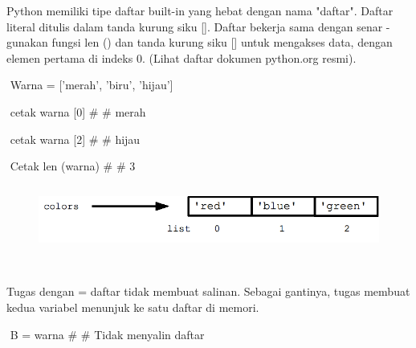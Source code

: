 \documentclass[a4paper,12pt]{report}
\begin{document}
\vspace{14pt}
\noindent 
Python memiliki tipe daftar built-in yang hebat dengan nama "daftar". Daftar literal ditulis dalam tanda kurung siku []. Daftar bekerja sama dengan senar - gunakan fungsi len () dan tanda kurung siku [] untuk mengakses data, dengan elemen pertama di indeks 0. (Lihat daftar dokumen python.org resmi). \par
\noindent 
\vspace{10pt}
\noindent 
{\fontsize{10pt}{10pt}\selectfont  $  $ $  $Warna = ['merah', 'biru', 'hijau']} \par
\noindent 
 $  $ $  $cetak warna [0]  $  \#  $ $  \#  $ merah \par
\noindent 
 $  $ $  $cetak warna [2]  $  \#  $ $  \#  $ hijau \par
\noindent 
 $  $ $  $Cetak len (warna)  $  \#  $ $  \#  $ 3 \par
\noindent 
\vspace{12pt}
\noindent 
\vspace{12pt}
\noindent 




\begin{figure}[H]
\begin{center}
\includegraphics[width=6.26in,height=0.88in]{./uploads_new/LISTS.docx_DIR/media/image1.png}
\end{center}
\end{figure}




{\fontsize{14pt}{14pt}\selectfont  \\}\vspace{14pt}
\noindent 
Tugas dengan = daftar tidak membuat salinan. Sebagai gantinya, tugas membuat kedua variabel menunjuk ke satu daftar di memori. \par
\noindent 
\vspace{10pt}
\noindent 
{\fontsize{10pt}{10pt}\selectfont  $  $ $  $B = warna  $  \#  $ $  \#  $ Tidak menyalin daftar} \par
\noindent 


\end{document}
